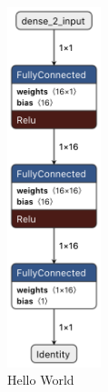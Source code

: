 \documentclass{tum-presentation}
\begin{document}
\begin{frame}

\vspace{-2em}
\begin{figure}[h]
     \centering
     \begin{subfigure}[b]{0.3\textwidth}
         \centering
         \includegraphics[width=0.3\textwidth]{figures/hello_world_graph.png}
         \caption{Hello World}
         \label{fig:netron_hello_world}
     \end{subfigure}
     \hfill
     \begin{subfigure}[b]{0.3\textwidth}
         \centering

\end{subfigure}
\end{figure}
\end{frame}
\end{document}
